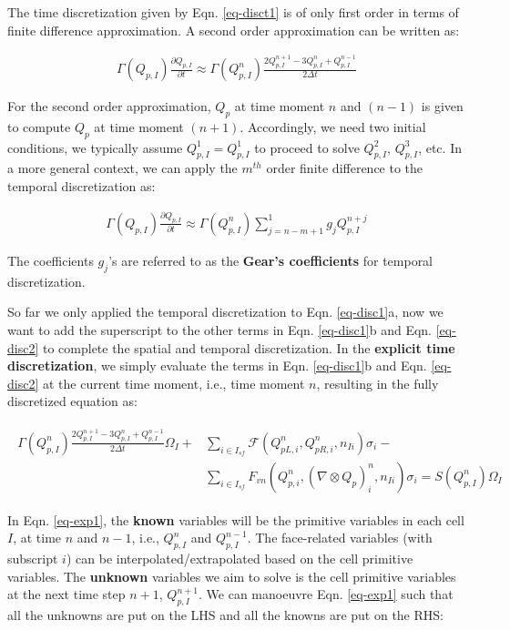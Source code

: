 \documentclass[12pt, letterpaper]{report}
\begin{document}
The time discretization given by Eqn. \ref{eq-disct1} is of only first order in terms of finite
difference approximation. A second order approximation can be written as:

\begin{align}\label{eq-disct2}
   \Gamma(Q_{p,I})\frac{\partial Q_{p,I}}{\partial t} \approx \Gamma(Q_{p,I}^n) \frac{2Q_{p,I}^{n+1} -
   3Q_{p,I}^n + Q_{p,I}^{n-1}}{2\Delta t}
\end{align}

For the second order approximation, $Q_p$ at time moment $n$ and $(n-1)$ is given to compute $Q_p$
at time moment $(n+1)$. Accordingly, we need two initial conditions, we typically assume $Q_{p,I}^1
= Q_{p,I}^1$ to proceed to solve $Q_{p,I}^2$, $Q_{p,I}^3$, etc. In a more general context, we can
apply the $m^{th}$ order finite difference to the temporal discretization as:

\begin{align*}
   \Gamma(Q_{p,I})\frac{\partial Q_{p,I}}{\partial t} \approx \Gamma(Q_{p,I}^n) \sum_{j=n-m+1}^{1}
   g_j Q_{p,I}^{n+j}
\end{align*}

The coefficients $g_j$'s are referred to as the {\bf Gear's coefficients} for temporal
discretization. \paraspace

So far we only applied the temporal discretization to Eqn. \ref{eq-disc1}a, now we want to add the
superscript to the other terms in Eqn. \ref{eq-disc1}b and Eqn. \ref{eq-disc2} to complete the
spatial and temporal discretization. In the {\bf explicit time discretization}, we simply evaluate the
terms in Eqn. \ref{eq-disc1}b and Eqn. \ref{eq-disc2} at the current time moment, i.e., time moment
$n$, resulting in the fully discretized equation as:

\begin{align}\label{eq-exp1}
   \begin{split}
      \Gamma(Q_{p,I}^n) \frac{2Q_{p,I}^{n+1} - 3Q_{p,I}^n + Q_{p,I}^{n-1}}{2\Delta t} \Omega_I +
      &\sum_{i \in I_{sf}} \mathcal{F}(Q_{pL,i}^n, Q_{pR,i}^n, n_{Ii}) \sigma_i - \\ &\sum_{i \in
      I_{sf}} F_{vn}(Q_{p,i}^n, (\nabla \mathop{\otimes} Q_p)_i^n, n_{Ii}) \sigma_i = S(Q_{p,I}^n)
      \Omega_I
   \end{split}
\end{align}

In Eqn. \ref{eq-exp1}, the {\bf known} variables will be the primitive variables in each cell $I$,
at time $n$ and $n-1$, i.e., $Q_{p,I}^n$ and $Q_{p,I}^{n-1}$. The face-related variables (with
subscript $i$) can be interpolated/extrapolated based on the cell primitive variables. The {\bf
unknown} variables we aim to solve is the cell primitive variables at the next time step $n+1$,
$Q_{p,I}^{n+1}$. We can manoeuvre Eqn. \ref{eq-exp1} such that all the unknowns are put on the LHS and
all the knowns are put on the RHS:
\end{document}

